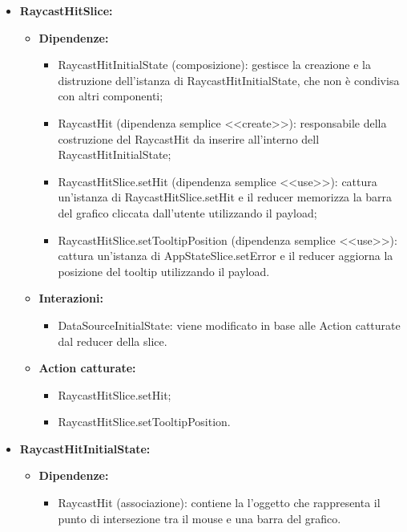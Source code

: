\begin{itemize}
    \item \textbf{RaycastHitSlice:}
    \begin{itemize}
        \item \textbf{Dipendenze:}
        \begin{itemize}
            \item RaycastHitInitialState (composizione): gestisce la creazione e la distruzione dell'istanza di RaycastHitInitialState, che non è condivisa con altri componenti;
            \item RaycastHit (dipendenza semplice <<create>>): responsabile della costruzione del RaycastHit da inserire all’interno dell RaycastHitInitialState;
            \item RaycastHitSlice.setHit (dipendenza semplice <<use>>): cattura un’istanza di RaycastHitSlice.setHit e il reducer memorizza la barra del grafico cliccata dall'utente utilizzando il payload;
            \item RaycastHitSlice.setTooltipPosition (dipendenza semplice <<use>>): cattura un’istanza di AppStateSlice.setError e il reducer aggiorna la posizione del tooltip utilizzando il payload.
        \end{itemize} 
        \item \textbf{Interazioni:}
        \begin{itemize}
            \item DataSourceInitialState: viene modificato in base alle Action catturate dal reducer della slice.
        \end{itemize} 
        \item \textbf{Action catturate:}
        \begin{itemize}
            \item RaycastHitSlice.setHit;
            \item RaycastHitSlice.setTooltipPosition.
        \end{itemize} 
    \end{itemize}

    
    \item \textbf{RaycastHitInitialState:}
    \begin{itemize}
        \item \textbf{Dipendenze:}
        \begin{itemize}
            \item RaycastHit (associazione): contiene la l'oggetto che rappresenta il punto di intersezione tra il mouse e una barra del grafico.
        \end{itemize} 
    \end{itemize}


\end{itemize}
